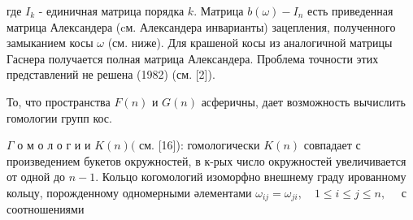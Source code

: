 \documentclass[10pt]{article}
\begin{document}
где $I_{k}$ - единичная матрица порядка $k$. Матрица $b(\omega)-I_{n}$ есть приведенная матрица Александера (cм. Александера инварианты) зацепления, полученного замыканием косы $\omega$ (см. ниже). Для крашеной косы из аналогичной матрицы Гаснера получается полная матрица Александера. Проблема точности этих представлений не решена (1982) (см. [2]).



То, что пространства $F(n)$ и $G(n)$ асферичны, дает возможность вычислить гомологии групп кос.



$\Gamma$ о м о л о г и и $K(n)($ см. [16]): гомологически $K(n)$ совпадает с произведением букетов окружностей, в к-рых число окружностей увеличивается от одной до $n-1$. Кольцо когомологий изоморфно внешнему граду ированному кольцу, порожденному одномерными әлементами $\omega_{i j}=\omega_{j i}, \quad 1 \leqslant i \leqslant j \leqslant n, \quad$ с соотношениями
\end{document}
